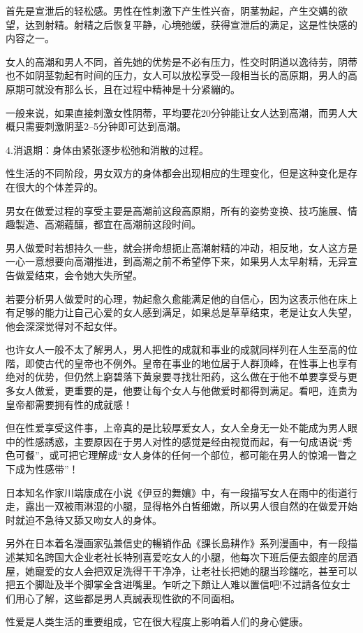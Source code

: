 \documentclass[12pt,UTF8]{ctexbook}
\begin{document}
首先是宣泄后的轻松感。男性在性刺激下产生性兴奋，阴茎勃起，产生交媾的欲望，达到射精。射精之后恢复平静，心境弛缓，获得宣泄后的满足，这是性快感的内容之一。

女人的高潮和男人不同，首先她的优势是不必有压力，性交时阴道以逸待劳，阴蒂也不如阴茎勃起有时间的压力，女人可以放松享受一段相当长的高原期，男人的高原期可就没有那么长，且在过程中精神是十分紧繃的。

一般来说，如果直接刺激女性阴蒂，平均要花20分钟能让女人达到高潮，而男人大概只需要刺激阴茎2--5分钟即可达到高潮。

4.消退期：身体由紧张逐步松弛和消散的过程。

性生活的不同阶段，男女双方的身体都会出现相应的生理变化，但是这种变化是存在很大的个体差异的。

男女在做爱过程的享受主要是高潮前这段高原期，所有的姿势变换、技巧施展、情趣製造、高潮蘊釀，都宜在高潮前这段时间。

男人做爱时若想持久一些，就会拼命想扼止高潮射精的冲动，相反地，女人这方是一心一意想要向高潮推进，到高潮之前不希望停下来，如果男人太早射精，无异宣告做爱结束，会令她大失所望。

若要分析男人做爱时的心理，勃起愈久愈能满足他的自信心，因为这表示他在床上有足够的能力让自己心爱的女人感到满足，如果总是草草结束，老是让女人失望，他会深深觉得对不起女伴。

也许女人一般不太了解男人，男人把性的成就和事业的成就同样列在人生至高的位階，即使古代的皇帝也不例外。皇帝在事业的地位居于人群顶峰，在性事上也享有绝对的优势，但仍然上窮碧落下黄泉要寻找壮阳药，这么做在于他不单要享受与更多女人做爱，更重要的是，他要让每个女人与他做爱时都得到满足。看吧，连贵为皇帝都需要拥有性的成就感！

但在性爱享受这件事，上帝真的是比较厚爱女人，女人全身无一处不能成为男人眼中的性感誘惑，主要原因在于男人对性的感觉是经由视觉而起，有一句成语说“秀色可餐”，或可把它理解成“女人身体的任何一个部位，都可能在男人的惊鴻一瞥之下成为性感带”！

日本知名作家川端康成在小说《伊豆的舞孃》中，有一段描写女人在雨中的街道行走，露出一双被雨淋湿的小腿，显得格外白皙细嫩，所以男人很自然的在做爱开始时就迫不急待又舔又吻女人的身体。

另外在日本着名漫画家弘兼信史的暢销作品《課长島耕作》系列漫画中，有一段描述某知名跨国大企业老社长特别喜爱吃女人的小腿，他每次下班后便去銀座的居酒屋，她寵爱的女人会把双足洗得干干净净，让老社长把她的腿当珍饈吃，甚至可以把五个脚趾及半个脚掌全含进嘴里。乍听之下頗让人难以置信吧!不过請各位女士们用心了解，这些都是男人真誠表现性欲的不同面相。

性爱是人类生活的重要组成，它在很大程度上影响着人们的身心健康。
\end{document}
